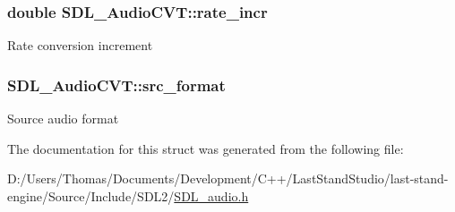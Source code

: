 \subsubsection[{rate\+\_\+incr}]{\setlength{\rightskip}{0pt plus 5cm}double S\+D\+L\+\_\+\+Audio\+C\+V\+T\+::rate\+\_\+incr}\label{structSDL__AudioCVT_ad886122c23a6673073baace31bff3b6c}
Rate conversion increment \hypertarget{structSDL__AudioCVT_a6ae81231e017105e6d5e745a51732e16}{}
\subsubsection[{src\+\_\+format}]{ S\+D\+L\+\_\+\+Audio\+C\+V\+T\+::src\+\_\+format}\label{structSDL__AudioCVT_a6ae81231e017105e6d5e745a51732e16}
Source audio format 

The documentation for this struct was generated from the following file\+:\begin{DoxyCompactItemize}
\item 
D\+:/\+Users/\+Thomas/\+Documents/\+Development/\+C++/\+Last\+Stand\+Studio/last-\/stand-\/engine/\+Source/\+Include/\+S\+D\+L2/\hyperlink{SDL__audio_8h}{S\+D\+L\+\_\+audio.\+h}\end{DoxyCompactItemize}
